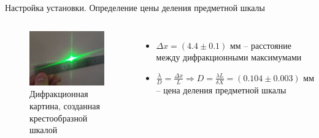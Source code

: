 \documentclass[11pt]{beamer} %
\begin{document}
    \begin{frame}{Настройка установки. Определение цены деления предметной шкалы}
    \small
        \begin{columns}
            \begin{figure}[H]
                \centering
                \includegraphics[width = \textwidth]{images/cross_subject_scale.jpeg}
                \caption{Дифракционная картина, созданная крестообразной шкалой}
            \end{figure}
        
            \begin{itemize}
                \item $\Delta x = \left( 4.4 \pm 0.1 \right) \text{ мм}$ -- расстояние между дифракционными максимумами
                \item $\frac{\lambda}{D} = \frac{\Delta x}{L} \Rightarrow D = \frac{\lambda L}{\delta X} = \left( 0.104 \pm 0.003 \right) \text{ мм}$ -- цена деления предметной шкалы
            \end{itemize}
        
        \end{columns}
    \end{frame}
\end{document}

